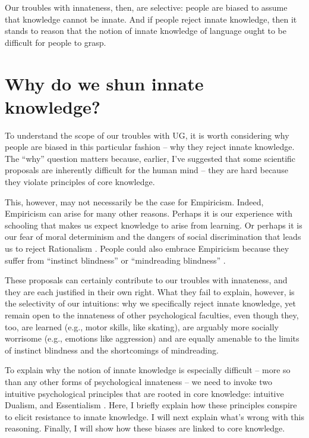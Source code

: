 \documentclass[output=paper,colorlinks,citecolor=brown
]{langscibook}
\begin{document}
Our troubles with innateness, then, are selective: people are biased to assume that knowledge cannot be innate. And if people reject innate knowledge, then it stands to reason that the notion of innate knowledge of language ought to be difficult for people to grasp.

\section{Why do we shun innate knowledge?}\largerpage

To understand the scope of our troubles with UG, it is worth considering why people are biased in this particular fashion -- why they reject innate knowledge. The “why” question matters because, earlier, I’ve suggested that some scientific proposals are inherently difficult for the human mind -- they are hard because they violate principles of core knowledge.

This, however, may not necessarily be the case for Empiricism. Indeed, Empiricism can arise for many other reasons. Perhaps it is our experience with schooling that makes us expect knowledge to arise from learning. Or perhaps it is our fear of moral determinism and the dangers of social discrimination that leads us to reject Rationalism \citep{pinker2004blank}. People could also embrace Empiricism because they suffer from “instinct blindness” \citep{cosmides1994origins} or “mindreading blindness” \citep{carruthers2020mindreading}.

These proposals can certainly contribute to our troubles with innateness, and they are each justified in their own right. What they fail to explain, however, is the selectivity of our intuitions: why we specifically reject innate knowledge, yet remain open to the innateness of other psychological faculties, even though they, too, are learned (e.g., motor skills, like skating), are arguably more socially worrisome (e.g., emotions like aggression) and are equally amenable to the limits of instinct blindness and the shortcomings of mindreading.  

To explain why the notion of innate knowledge is especially difficult -- more so than any other forms of psychological innateness -- we need to invoke two intuitive psychological principles that are rooted in core knowledge: intuitive Dualism, and Essentialism \citep{berent2020blind,berent2021canwe}. Here, I briefly explain how these principles conspire to elicit resistance to innate knowledge. I will next explain what’s wrong with this reasoning. Finally, I will show how these biases are linked to core knowledge.
\end{document}
